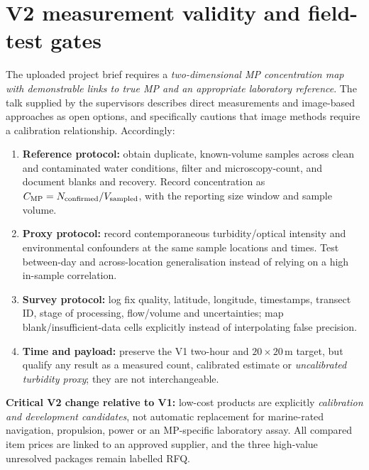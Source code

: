 \documentclass[10pt,a4paper]{article}
\begin{document}
\section{V2 measurement validity and field-test gates}
The uploaded project brief requires a \emph{two-dimensional MP concentration map with demonstrable links to true MP and an appropriate laboratory reference}. The talk supplied by the supervisors describes direct measurements and image-based approaches as open options, and specifically cautions that image methods require a calibration relationship. Accordingly:
\begin{enumerate}[leftmargin=*]
\item \textbf{Reference protocol:} obtain duplicate, known-volume samples across clean and contaminated water conditions, filter and microscopy-count, and document blanks and recovery. Record concentration as \(C_{\rm MP}=N_{\rm confirmed}/V_{\rm sampled}\), with the reporting size window and sample volume.
\item \textbf{Proxy protocol:} record contemporaneous turbidity/optical intensity and environmental confounders at the same sample locations and times. Test between-day and across-location generalisation instead of relying on a high in-sample correlation.
\item \textbf{Survey protocol:} log fix quality, latitude, longitude, timestamps, transect ID, stage of processing, flow/volume and uncertainties; map blank/insufficient-data cells explicitly instead of interpolating false precision.
\item \textbf{Time and payload:} preserve the V1 two-hour and \(20\times20\,\mathrm m\) target, but qualify any result as a measured count, calibrated estimate or \emph{uncalibrated turbidity proxy}; they are not interchangeable.
\end{enumerate}
\textbf{Critical V2 change relative to V1:} low-cost products are explicitly \emph{calibration and development candidates}, not automatic replacement for marine-rated navigation, propulsion, power or an MP-specific laboratory assay. All compared item prices are linked to an approved supplier, and the three high-value unresolved packages remain labelled RFQ.

\printbibliography[title={References and manufacturer documentation}]
\end{document}
